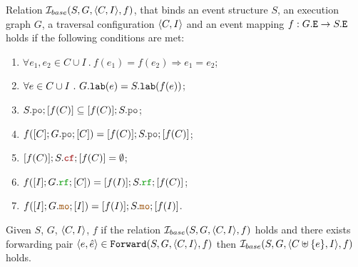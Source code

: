\documentclass[12pt]{article}
\begin{document}
\begin{definition}
  Relation $\mathcal{I}_{base}(S, G, \langle C, I \rangle, f)$, that binds an 
  event structure $S$, an \imm execution graph $G$,
  a traversal configuration $\langle C, I \rangle$
  and an event mapping $f : G.{\mathtt{E}} \rightarrow S.{\mathtt{E}}$ 
  holds if the following conditions are met:
  \begin{enumerate}[label=\textbf{S.\arabic*}]

    \item \label{item:sim-inj}
      $\forall{e_1, e_2 \in C \cup I} ~.~ f(e_1) = f(e_2) \Rightarrow e_1 = e_2$;

    \item \label{item:sim-lab}
      $\forall{e \in C \cup I} ~.~ G.{\mathtt{lab}}(e) = S.{\mathtt{lab}}(f(e))$;

    \item \label{item:sim-po-prfx} 
      $S.\lPO;[f(C)] \subseteq [f(C)];S.\lPO$;

    \item \label{item:sim-po}
      $f([C];G.\lPO;[C]) = [f(C)];S.\lPO;[f(C)]$;
    
    \item \label{item:sim-cf}
      $[f(C)];S.\lCF;[f(C)] = \emptyset$;

    \item \label{item:sim-rf}
      $f([I];G.\lRF;[C]) = [f(I)];S.\lRF;[f(C)]$;

    \item \label{item:sim-mo}
      $f([I];G.\lMO;[I]) = [f(I)];S.\lMO;[f(I)]$.
    
  \end{enumerate}
\end{definition}

\begin{lemma}
  \label{lemma:sim-forward}
  Given $S$, $G$, $\langle C, I \rangle$, $f$
  if the relation $\mathcal{I}_{base}(S, G, \langle C, I \rangle, f)$ holds and 
  there exists forwarding pair $\langle e, \hat{e} \rangle \in {\mathtt{Forward}}(S, G, \langle C, I \rangle, f)$
  then $\mathcal{I}_{base}(S, G, \langle C \uplus \{e\}, I \rangle, f)$ holds. 
\end{lemma}
\end{document}
